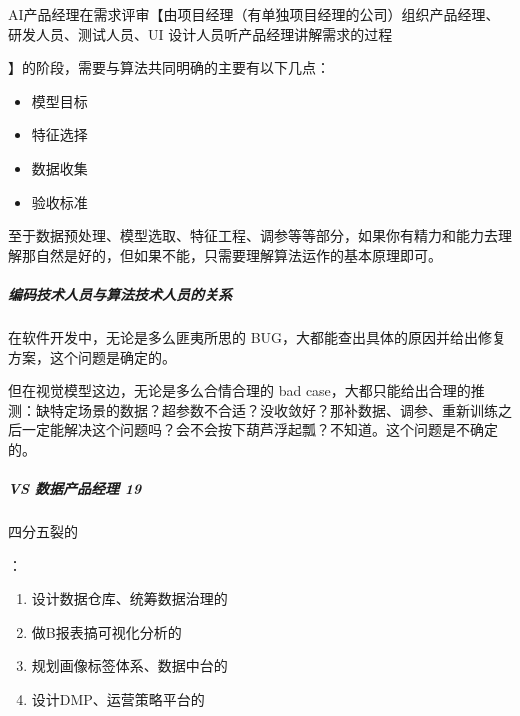 \documentclass[letterpaper,11pt,english]{sphinxmanual}
\begin{document}
AI产品经理在需求评审【由项目经理（有单独项目经理的公司）组织产品经理、研发人员、测试人员、UI
设计人员听产品经理讲解需求的过程%
\begin{footnote}[244]\sphinxAtStartFootnote
{}
%
\end{footnote}】的阶段，需要与算法共同明确的主要有以下几点：%
\begin{footnote}[245]\sphinxAtStartFootnote
{}
%
\end{footnote}
\begin{itemize}
\item {} 
模型目标

\item {} 
特征选择

\item {} 
数据收集

\item {} 
验收标准

\end{itemize}

至于数据预处理、模型选取、特征工程、调参等等部分，如果你有精力和能力去理解那自然是好的，但如果不能，只需要理解算法运作的基本原理即可。


\subparagraph{编码技术人员与算法技术人员的关系}
\label{\detokenize{chapter_introduction/AI_PM:id17}}
在软件开发中，无论是多么匪夷所思的
BUG，大都能查出具体的原因并给出修复方案，这个问题是确定的。

但在视觉模型这边，无论是多么合情合理的 bad
case，大都只能给出合理的推测：缺特定场景的数据？超参数不合适？没收敛好？那补数据、调参、重新训练之后一定能解决这个问题吗？会不会按下葫芦浮起瓢？不知道。这个问题是不确定的。


\subparagraph{VS 数据产品经理 19\sphinxfootnotemark[246]}
\label{\detokenize{chapter_introduction/AI_PM:vs-19}}%
\begin{footnotetext}[246]\sphinxAtStartFootnote
{}
%
\end{footnotetext}\ignorespaces 
四分五裂的%
\begin{footnote}[247]\sphinxAtStartFootnote
{}
%
\end{footnote}：
\begin{enumerate}
%
\item {} 
设计数据仓库、统筹数据治理的

\item {} 
做B报表搞可视化分析的

\item {} 
规划画像标签体系、数据中台的

\item {} 
设计DMP、运营策略平台的

\end{enumerate}
\end{document}
